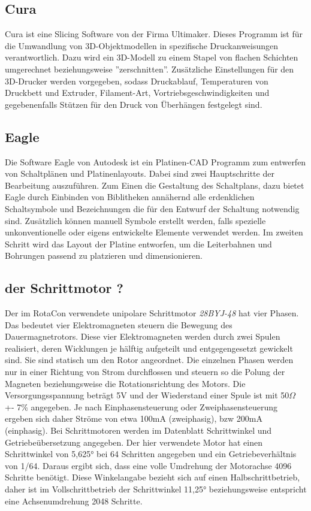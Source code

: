\documentclass[11pt, titlepage, fleqn]{report}
\begin{document}
			\subsection{Cura}
			\label{sec:Cura}
				Cura ist eine Slicing Software von der Firma Ultimaker. Dieses Programm ist für die Umwandlung von 3D-Objektmodellen in spezifische Druckanweisungen verantwortlich. Dazu wird ein 3D-Modell zu einem Stapel von flachen Schichten umgerechnet beziehungsweise ''zerschnitten''. Zusätzliche Einstellungen für den 3D-Drucker werden vorgegeben, sodass Druckablauf, Temperaturen von Druckbett und Extruder, Filament-Art, 
				Vortriebsgeschwindigkeiten und gegebenenfalls Stützen für den Druck von Überhängen festgelegt sind.
			\subsection{Eagle}
			\label{sec:Eagle}
				Die Software Eagle von Autodesk ist ein Platinen-CAD Programm zum entwerfen von Schaltplänen und Platinenlayouts. Dabei sind zwei Hauptschritte der Bearbeitung auszuführen. Zum Einen die Gestaltung des Schaltplans, dazu bietet Eagle durch Einbinden von Biblitheken annähernd alle erdenklichen 
				Schaltsymbole und Bezeichnungen die für den Entwurf der Schaltung notwendig sind. Zusätzlich können manuell Symbole erstellt werden, falls spezielle unkonventionelle oder eigens entwickelte Elemente verwendet werden.
				Im zweiten Schritt wird das Layout der Platine entworfen, um die Leiterbahnen und Bohrungen passend zu platzieren und dimensionieren.
			\subsection{der Schrittmotor ?}
			\label{sec:Motor}
				Der im RotaCon verwendete unipolare Schrittmotor \textit{28BYJ-48} hat vier Phasen. Das bedeutet vier Elektromagneten steuern die Bewegung des Dauermagnetrotors. Diese vier Elektromagneten werden durch zwei Spulen realisiert, deren Wicklungen je hälftig aufgeteilt und entgegengesetzt gewickelt sind. Sie sind statisch um den Rotor angeordnet. Die einzelnen Phasen werden nur in einer Richtung von Strom durchflossen und steuern so die Polung der Magneten beziehungsweise die Rotationsrichtung des Motors. Die Versorgungsspannung beträgt 5V und der Wiederstand einer Spule ist mit 50$\Omega$ +- 7\% angegeben. Je nach Einphasensteuerung oder Zweiphasensteuerung ergeben sich daher Ströme von etwa 100mA (zweiphasig), bzw 200mA (einphasig). Bei Schrittmotoren werden im Datenblatt Schrittwinkel und Getriebeübersetzung angegeben. Der hier verwendete Motor hat einen Schrittwinkel von 5,625° bei 64 Schritten angegeben und ein Getriebeverhältnis von 1/64. Daraus ergibt sich, dass eine volle Umdrehung der Motorachse 4096 Schritte benötigt. Diese Winkelangabe bezieht sich auf einen Halbschrittbetrieb, daher ist im Vollschrittbetrieb der Schrittwinkel 11,25° beziehungsweise entspricht eine Achsenumdrehung 2048 Schritte.
		\newpage
\end{document}
